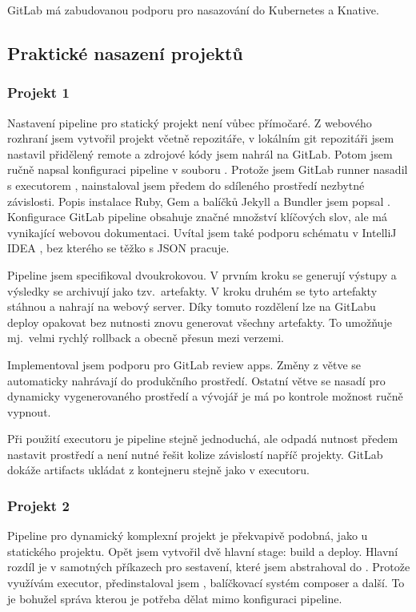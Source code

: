         GitLab má zabudovanou podporu pro nasazování do Kubernetes a Knative.
        \blind[2]

    \subsection{Praktické nasazení projektů}
        \subsubsection{Projekt 1}
            \label{subsec:gitlab-p1}
            Nastavení pipeline pro statický projekt není vůbec přímočaré. Z webového rozhraní jsem vytvořil projekt včetně repozitáře, v lokálním git repozitáři jsem nastavil přidělený remote a zdrojové kódy jsem nahrál na GitLab. Potom jsem ručně napsal konfiguraci pipeline v souboru . Protože jsem GitLab runner nasadil s executorem , nainstaloval jsem předem do sdíleného prostředí nezbytné závislosti. Popis instalace Ruby, Gem a balíčků Jekyll a Bundler jsem popsal . Konfigurace GitLab pipeline obsahuje značné množství klíčových slov, ale má vynikající webovou dokumentaci. Uvítal jsem také podporu schématu v  IntelliJ IDEA \cite{idea-gitlab-plugin}, bez kterého se těžko s JSON pracuje.

            Pipeline jsem specifikoval dvoukrokovou. V prvním kroku se generují výstupy a výsledky se archivují jako tzv.~artefakty. V kroku druhém  se tyto artefakty stáhnou a nahrají na webový server. Díky tomuto rozdělení lze na GitLabu deploy opakovat bez nutnosti znovu generovat všechny artefakty. To umožňuje mj.~velmi rychlý rollback a obecně přesun mezi verzemi.

            Implementoval jsem podporu pro GitLab review apps. Změny z větve  se automaticky nahrávají do produkčního prostředí. Ostatní větve se nasadí pro dynamicky vygenerovaného prostředí a vývojář je má po kontrole možnost ručně vypnout.

            Při použití  executoru je pipeline stejně jednoduchá, ale odpadá nutnost předem nastavit prostředí a není nutné řešit kolize závislostí napříč projekty. GitLab dokáže artifacts ukládat z kontejneru stejně jako v  executoru.

        \subsubsection{Projekt 2}
            Pipeline pro dynamický komplexní projekt je překvapivě podobná, jako u statického projektu. Opět jsem vytvořil dvě hlavní stage: build a deploy. Hlavní rozdíl je v samotných příkazech pro sestavení, které jsem abstrahoval do . Protože využívám  executor, předinstaloval jsem , balíčkovací systém composer a další. To je bohužel správa kterou je potřeba dělat mimo konfiguraci pipeline.

